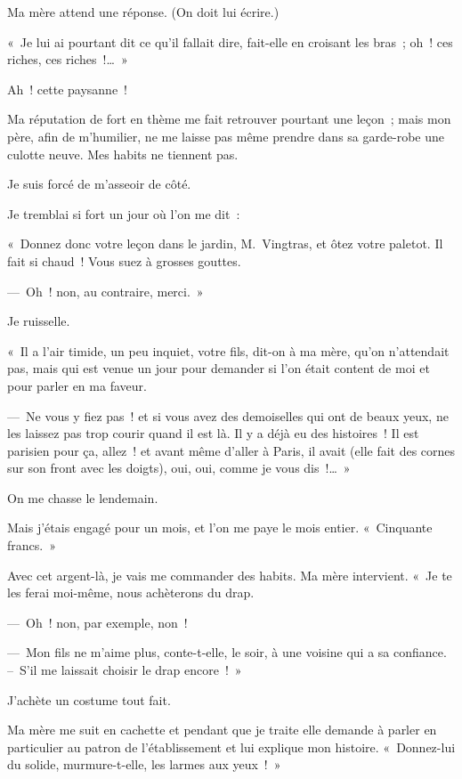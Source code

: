 \documentclass[french,twoside]{book} %
\begin{document}
Ma mère attend une réponse. (On doit lui écrire.)\par
« Je lui ai pourtant dit ce qu’il fallait dire, fait-elle en croisant les bras ; oh ! ces riches, ces riches !… »\par
Ah ! cette paysanne !\par
\bigbreak
\noindent Ma réputation de fort en thème me fait retrouver pourtant une leçon ; mais mon père, afin de m’humilier, ne me laisse pas même prendre dans sa garde-robe une culotte neuve. Mes habits ne tiennent pas.\par
Je suis forcé de m’asseoir de côté.\par
Je tremblai si fort un jour où l’on me dit :\par
« Donnez donc votre leçon dans le jardin, M. Vingtras, et ôtez votre paletot. Il fait si chaud ! Vous suez à grosses gouttes.\par
— Oh ! non, au contraire, merci. »\par
Je ruisselle.\par
« Il a l’air timide, un peu inquiet, votre fils, dit-on à ma mère, qu’on n’attendait pas, mais qui est venue un jour pour demander si l’on était content de moi et pour parler en ma faveur.\par
— Ne vous y fiez pas ! et si vous avez des demoiselles qui ont de beaux yeux, ne les laissez pas trop courir quand il est là. Il y a déjà eu des histoires ! Il est parisien pour ça, allez ! et avant même d’aller à Paris, il avait (elle fait des cornes sur son front avec les doigts), oui, oui, comme je vous dis !… »\par
On me chasse le lendemain.\par
Mais j’étais engagé pour un mois, et l’on me paye le mois entier. « Cinquante francs. »\par
\bigbreak
\noindent Avec cet argent-là, je vais me commander des habits. Ma mère intervient. « Je te les ferai moi-même, nous achèterons du drap.\par
— Oh ! non, par exemple, non !\par
— Mon fils ne m’aime plus, conte-t-elle, le soir, à une voisine qui a sa confiance. – S’il me laissait choisir le drap encore ! »\par
J’achète un costume tout fait.\par
Ma mère me suit en cachette et pendant que je traite elle demande à parler en particulier au patron de l’établissement et lui explique mon histoire. « Donnez-lui du solide, murmure-t-elle, les larmes aux yeux ! »\par
\end{document}
